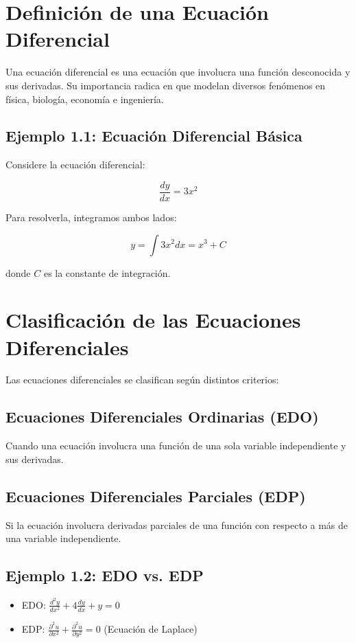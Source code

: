 
\section{Definición de una Ecuación Diferencial}
Una ecuación diferencial es una ecuación que involucra una función desconocida y sus derivadas. Su importancia radica en que modelan diversos fenómenos en física, biología, economía e ingeniería.

\subsection*{Ejemplo 1.1: Ecuación Diferencial Básica}
Considere la ecuación diferencial:

\begin{equation}
\frac{dy}{dx} = 3x^2
\end{equation}

Para resolverla, integramos ambos lados:

\begin{equation}
y = \int 3x^2 dx = x^3 + C
\end{equation}

donde \( C \) es la constante de integración.

\section{Clasificación de las Ecuaciones Diferenciales}
Las ecuaciones diferenciales se clasifican según distintos criterios:

\subsection{Ecuaciones Diferenciales Ordinarias (EDO)}
Cuando una ecuación involucra una función de una sola variable independiente y sus derivadas.

\subsection{Ecuaciones Diferenciales Parciales (EDP)}
Si la ecuación involucra derivadas parciales de una función con respecto a más de una variable independiente.

\subsection*{Ejemplo 1.2: EDO vs. EDP}
\begin{itemize}
    \item EDO: \( \frac{d^2y}{dx^2} + 4\frac{dy}{dx} + y = 0 \)
    \item EDP: \( \frac{\partial^2 u}{\partial x^2} + \frac{\partial^2 u}{\partial y^2} = 0 \) (Ecuación de Laplace)
\end{itemize}

